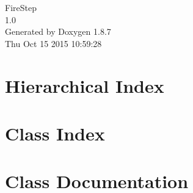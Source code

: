 \documentclass[twoside]{book}
\newcommand{\+}{\discretionary{\mbox{\scriptsize$\hookleftarrow$}}{}{}}
\newcommand{\clearemptydoublepage}{%
  \newpage{\pagestyle{empty}\cleardoublepage}%
}
\begin{document}
\hypersetup{pageanchor=false,
             bookmarks=true,
             bookmarksnumbered=true,
             pdfencoding=unicode
            }
\begin{titlepage}
\vspace*{7cm}
\begin{center}%
{\Large Fire\+Step \\[1ex]\large 1.\+0 }\\
\vspace*{1cm}
{\large Generated by Doxygen 1.8.7}\\
\vspace*{0.5cm}
{\small Thu Oct 15 2015 10:59:28}\\
\end{center}
\end{titlepage}
\clearemptydoublepage
\tableofcontents
\clearemptydoublepage
{}
\hypersetup{pageanchor=true}

\chapter{Hierarchical Index}

\chapter{Class Index}

\chapter{Class Documentation}






























\newpage
{}
{}
\printindex
\end{document}
